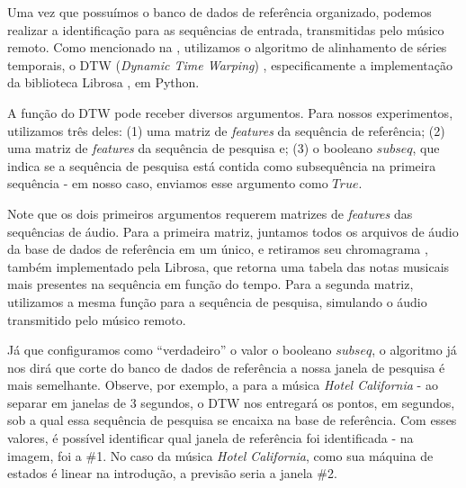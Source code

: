 Uma vez que possuímos o banco de dados de referência organizado, podemos realizar a identificação para as sequências de entrada, transmitidas pelo músico remoto. Como mencionado na , utilizamos o algoritmo de alinhamento de séries temporais, o DTW (\textit{Dynamic Time Warping}) \cite{dtw}, especificamente a implementação da biblioteca Librosa \cite{librosa}, em Python.

A função do DTW pode receber diversos argumentos. Para nossos experimentos, utilizamos três deles: (1) uma matriz de \textit{features} da sequência de referência; (2) uma matriz de \textit{features} da sequência de pesquisa e; (3) o booleano $subseq$, que indica se a sequência de pesquisa está contida como subsequência na primeira sequência - em nosso caso, enviamos esse argumento como $True$.

Note que os dois primeiros argumentos requerem matrizes de \textit{features} das sequências de áudio. Para a primeira matriz, juntamos todos os arquivos de áudio da base de dados de referência em um único, e retiramos seu chromagrama \cite{chromagram}, também implementado pela Librosa, que retorna uma tabela das notas musicais mais presentes na sequência em função do tempo. Para a segunda matriz, utilizamos a mesma função para a sequência de pesquisa, simulando o áudio transmitido pelo músico remoto.

Já que configuramos como ``verdadeiro'' o valor o booleano $subseq$, o algoritmo já nos dirá que corte do banco de dados de referência a nossa janela de pesquisa é mais semelhante. Observe, por exemplo, a  para a música \textit{Hotel California} - ao separar em janelas de 3 segundos, o DTW nos entregará os pontos, em segundos, sob a qual essa sequência de pesquisa se encaixa na base de referência. Com esses valores, é possível identificar qual janela de referência foi identificada - na imagem, foi a \#1. No caso da música \textit{Hotel California}, como sua máquina de estados é linear na introdução, a previsão seria a janela \#2.

